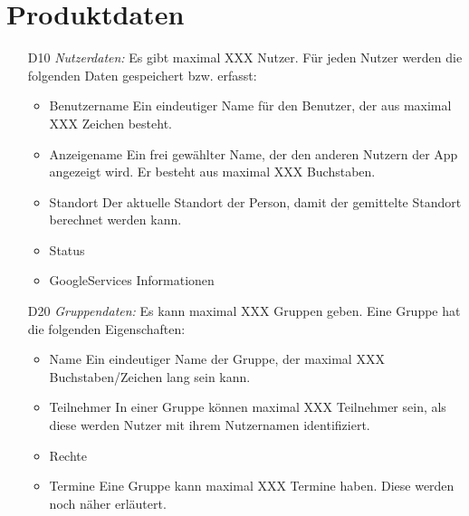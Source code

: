 \documentclass{scrartcl}
\begin{document}
	\section{Produktdaten}
	\begin{itemize}
		\item [D10] \textit{Nutzerdaten:}
		Es gibt maximal XXX Nutzer. Für jeden Nutzer werden die folgenden Daten gespeichert bzw. erfasst:
		\begin{itemize}
			\item Benutzername
			\newline Ein eindeutiger Name für den Benutzer, der aus maximal XXX Zeichen besteht.
			\item Anzeigename
			\newline Ein frei gewählter Name, der den anderen Nutzern der App angezeigt wird. Er besteht aus maximal XXX Buchstaben. %
			\item Standort
			\newline Der aktuelle Standort der Person, damit der gemittelte Standort berechnet werden kann.
			\item Status
			\newline 
			\item GoogleServices Informationen
			\newline 
		\end{itemize}
		
		\item [D20] \textit{Gruppendaten:}
		Es kann maximal XXX Gruppen geben. Eine Gruppe hat die folgenden Eigenschaften:
		\begin{itemize}
			\item Name
			\newline Ein eindeutiger Name der Gruppe, der maximal XXX Buchstaben/Zeichen lang sein kann.
			\item Teilnehmer
			\newline In einer Gruppe können maximal XXX Teilnehmer sein, als diese werden Nutzer mit ihrem Nutzernamen identifiziert.
			\item Rechte
			\newline
			\item Termine
			\newline Eine Gruppe kann maximal XXX Termine haben. Diese werden noch näher erläutert.
		\end{itemize}
		

\end{itemize}
\end{document}
